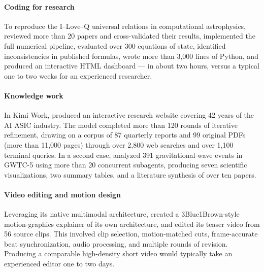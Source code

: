 \paragraph{Coding for research} To reproduce the I--Love--Q universal relations in computational astrophysics,  reviewed more than 20 papers and cross-validated their results, implemented the full numerical pipeline, evaluated over 300 equations of state, identified inconsistencies in published formulas, wrote more than 3,000 lines of Python, and produced an interactive HTML dashboard --- in about two hours, versus a typical one to two weeks for an experienced researcher. 

\paragraph{Knowledge work} In Kimi Work,  produced an interactive research website covering 42 years of the AI ASIC industry. The model completed more than 120 rounds of iterative refinement, drawing on a corpus of 87 quarterly reports and 99 original PDFs (more than 11,000 pages) through over 2,800 web searches and over 1,100 terminal queries.
In a second case,  analyzed 391 gravitational-wave events in GWTC-5 using more than 20 concurrent subagents, producing seven scientific visualizations, two summary tables, and a literature synthesis of over ten papers.



\paragraph{Video editing and motion design} Leveraging its native multimodal architecture,  created a 3Blue1Brown-style motion-graphics explainer of its own architecture, and edited its teaser video from 56 source clips. This involved clip selection, motion-matched cuts, frame-accurate beat synchronization, audio processing, and multiple rounds of revision. Producing a comparable high-density short video would typically take an experienced editor one to two days.